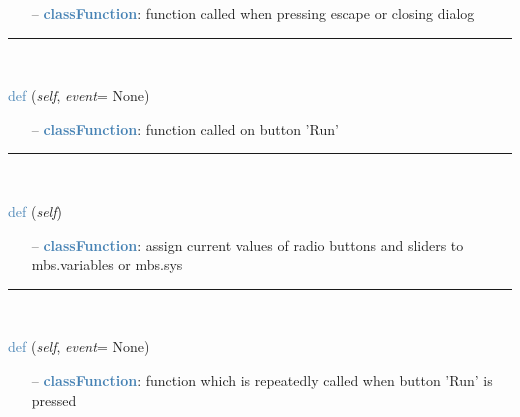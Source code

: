 \begin{itemize}[leftmargin=1.4cm]
\begin{itemize}[leftmargin=1.4cm]
\begin{itemize}[leftmargin=1.4cm]
\begin{itemize}[leftmargin=0.5cm]
\begin{itemize}[leftmargin=1.4cm]
\begin{itemize}[leftmargin=1.4cm]
\begin{itemize}[leftmargin=0.5cm]
\begin{itemize}[leftmargin=1.4cm]
\begin{itemize}[leftmargin=0.5cm]
\begin{itemize}[leftmargin=1.4cm]
\begin{itemize}[leftmargin=1.4cm]
\begin{itemize}[leftmargin=0.7cm]
\item[--]\textcolor{steelblue}{\bf classFunction}: function called when pressing escape or closing dialog
\vspace{12pt}\end{itemize}
%
\noindent\rule{8cm}{0.75pt}\vspace{1pt} \\ 
\begin{flushleft}
\noindent \textcolor{steelblue}{def {\bf {}}}\label{sec:interactive:InteractiveDialog:StartSimulation}
({\it self}, {\it event}= None)
\end{flushleft}
\setlength{\itemindent}{0.7cm}
\begin{itemize}[leftmargin=0.7cm]
\item[--]\textcolor{steelblue}{\bf classFunction}: function called on button 'Run'
\vspace{12pt}\end{itemize}
%
\noindent\rule{8cm}{0.75pt}\vspace{1pt} \\ 
\begin{flushleft}
\noindent \textcolor{steelblue}{def {\bf {}}}\label{sec:interactive:InteractiveDialog:ProcessWidgetStates}
({\it self})
\end{flushleft}
\setlength{\itemindent}{0.7cm}
\begin{itemize}[leftmargin=0.7cm]
\item[--]\textcolor{steelblue}{\bf classFunction}: assign current values of radio buttons and sliders to mbs.variables or mbs.sys
\vspace{12pt}\end{itemize}
%
\noindent\rule{8cm}{0.75pt}\vspace{1pt} \\ 
\begin{flushleft}
\noindent \textcolor{steelblue}{def {\bf {}}}\label{sec:interactive:InteractiveDialog:ContinuousRunFunction}
({\it self}, {\it event}= None)
\end{flushleft}
\setlength{\itemindent}{0.7cm}
\begin{itemize}[leftmargin=0.7cm]
\item[--]\textcolor{steelblue}{\bf classFunction}: function which is repeatedly called when button 'Run' is pressed

\end{itemize}
\end{itemize}
\end{itemize}
\end{itemize}
\end{itemize}
\end{itemize}
\end{itemize}
\end{itemize}
\end{itemize}
\end{itemize}
\end{itemize}
\end{itemize}

